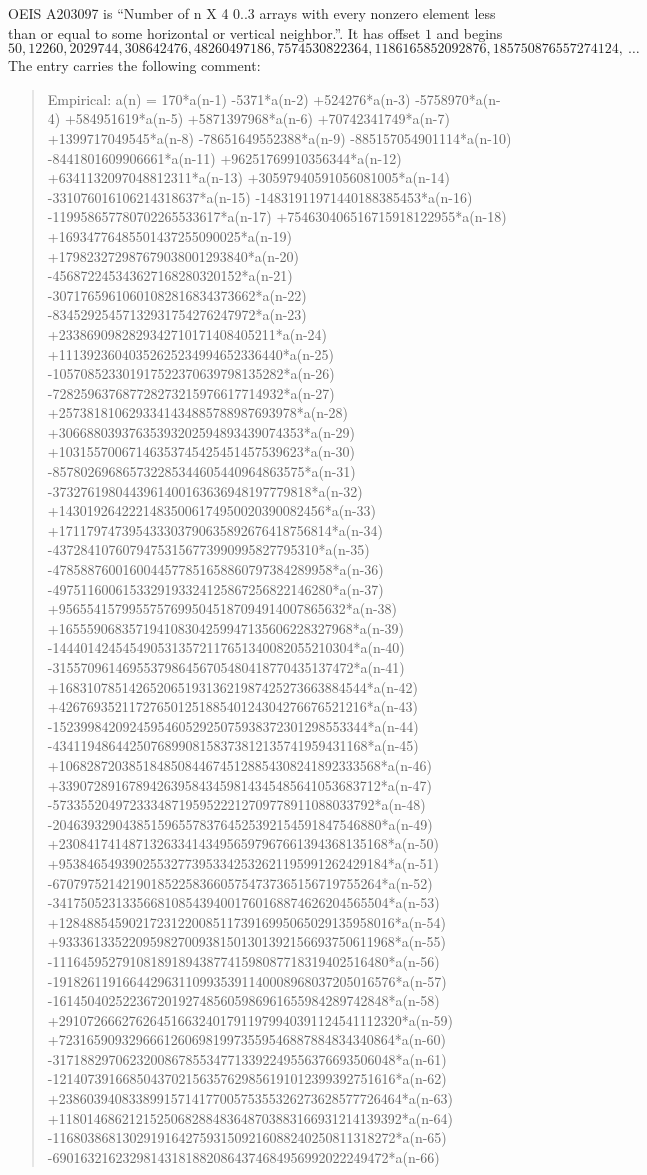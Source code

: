 \documentclass[11pt,a4paper]{article}
\theoremstyle{plain}
\theoremstyle{definition}
\begin{document}
OEIS A203097 is ``Number of n X 4 0..3 arrays with every nonzero element less than or equal to some horizontal or vertical neighbor.''. It has offset $1$ and begins
\[
50, 12260, 2029744, 308642476, 48260497186, 7574530822364, 1186165852092876, 185750876557274124,\ \dots
\]
The entry carries the following comment:
\begin{quote}\small
Empirical: a(n) = 170*a(n-1) -5371*a(n-2) +524276*a(n-3) -5758970*a(n-4) +584951619*a(n-5) +5871397968*a(n-6) +70742341749*a(n-7) +1399717049545*a(n-8) -78651649552388*a(n-9) -885157054901114*a(n-10) -8441801609906661*a(n-11) +96251769910356344*a(n-12) +6341132097048812311*a(n-13) +30597940591056081005*a(n-14) -331076016106214318637*a(n-15) -14831911971440188385453*a(n-16) -119958657780702265533617*a(n-17) +754630406516715918122955*a(n-18) +16934776485501437255090025*a(n-19) +179823272987679038001293840*a(n-20) -456872245343627168280320152*a(n-21) -30717659610601082816834373662*a(n-22) -83452925457132931754276247972*a(n-23) +2338690982829342710171408405211*a(n-24) +11139236040352625234994652336440*a(n-25) -105708523301917522370639798135282*a(n-26) -728259637687728273215976617714932*a(n-27) +2573818106293341434885788987693978*a(n-28) +30668803937635393202594893439074353*a(n-29) +10315570067146353745425451457539623*a(n-30) -857802696865732285344605440964863575*a(n-31) -3732761980443961400163636948197779818*a(n-32) +14301926422214835006174950020390082456*a(n-33) +171179747395433303790635892676418756814*a(n-34) -43728410760794753156773990995827795310*a(n-35) -4785887600160044577851658860797384289958*a(n-36) -4975116006153329193324125867256822146280*a(n-37) +95655415799557576995045187094914007865632*a(n-38) +165559068357194108304259947135606228327968*a(n-39) -1444014245454905313572117651340082055210304*a(n-40) -3155709614695537986456705480418770435137472*a(n-41) +16831078514265206519313621987425273663884544*a(n-42) +42676935211727650125188540124304276676521216*a(n-43) -152399842092459546052925075938372301298553344*a(n-44) -434119486442507689908158373812135741959431168*a(n-45) +1068287203851848508446745128854308241892333568*a(n-46) +3390728916789426395843459814345485641053683712*a(n-47) -5733552049723334871959522212709778911088033792*a(n-48) -20463932904385159655783764525392154591847546880*a(n-49) +23084174148713263341434956597967661394368135168*a(n-50) +95384654939025532773953342532621195991262429184*a(n-51) -67079752142190185225836605754737365156719755264*a(n-52) -341750523133566810854394001760168874626204565504*a(n-53) +128488545902172312200851173916995065029135958016*a(n-54) +933361335220959827009381501301392156693750611968*a(n-55) -111645952791081891894387741598087718319402516480*a(n-56) -1918261191664429631109935391140008968037205016576*a(n-57) -161450402522367201927485605986961655984289742848*a(n-58) +2910726662762645166324017911979940391124541112320*a(n-59) +723165909329666126069819973559546887884834340864*a(n-60) -3171882970623200867855347713392249556376693506048*a(n-61) -1214073916685043702156357629856191012399392751616*a(n-62) +2386039408338991571417700575355326273628577726464*a(n-63) +1180146862121525068288483648703883166931214139392*a(n-64) -1168038681302919164275931509216088240250811318272*a(n-65) -690163216232981431818820864374684956992022249472*a(n-66) 
\end{quote}
\end{document}
